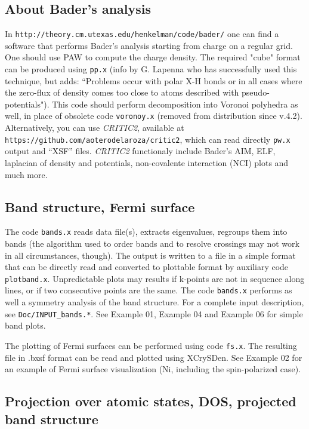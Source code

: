 \documentclass[12pt,a4paper]{article}
\begin{document}
\subsection{About Bader's analysis}
In \texttt{http://theory.cm.utexas.edu/henkelman/code/bader/} 
one can find a software that performs Bader's analysis starting 
from charge on a regular grid. One should use PAW to compute the
charge density. The required "cube" format can be produced using 
\texttt{pp.x} (info by G. Lapenna who has successfully used this 
technique, but adds: ``Problems occur with polar X-H bonds or in
all cases where the zero-flux of density comes too close to atoms 
described with pseudo-potentials"). This code should perform 
decomposition into Voronoi polyhedra as well, in place of obsolete
code  \texttt{voronoy.x} (removed from distribution since v.4.2).
Alternatively, you can use \textsl{CRITIC2}, available at
\texttt{https://github.com/aoterodelaroza/critic2}, which can
read directly \texttt{pw.x} output and ``XSF'' files. \textsl{CRITIC2}
functionaly include Bader's AIM, ELF, laplacian of density and
potentials, non-covalente interaction (NCI) plots and much more.

\subsection{Band structure, Fermi surface}

The code \texttt{bands.x} reads data file(s), extracts eigenvalues,
regroups them into bands (the algorithm used to order bands and to resolve
crossings may not work in all circumstances, though). The output is written
to a file in a simple format that can be directly read and converted to
plottable format by auxiliary code
\texttt{plotband.x}. Unpredictable plots may results if k-points are not 
in sequence along lines, or if two consecutive points are the same. 
The code \texttt{bands.x} performs as well a 
symmetry analysis of the band structure. For a complete input description,
see \texttt{Doc/INPUT\_bands.*}. See Example 01, Example 04 and Example 06 
for simple band plots.

The plotting of Fermi surfaces can be performed using code \texttt{fs.x}.
The resulting file in .bxsf format can be read and plotted
using XCrySDen. See Example 02 for an example of Fermi surface 
visualization (Ni, including the spin-polarized case).

\subsection{Projection over atomic states, DOS, projected band structure}
\end{document}
